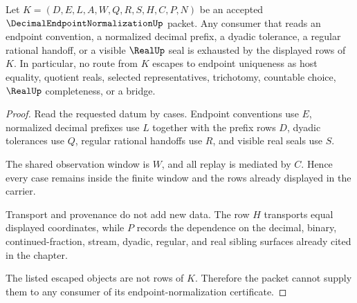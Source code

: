 \begin{theorem}\label{thm:decimal-endpoint-normalization-nonescape}
Let $K=(D,E,L,A,W,Q,R,S,H,C,P,N)$ be an accepted $\DecimalEndpointNormalizationUp$ packet. Any consumer that reads an endpoint convention, a normalized decimal prefix, a dyadic tolerance, a regular rational handoff, or a visible $\RealUp$ seal is exhausted by the displayed rows of $K$. In particular, no route from $K$ escapes to endpoint uniqueness as host equality, quotient reals, selected representatives, trichotomy, countable choice, $\RealUp$ completeness, or a bridge.
\end{theorem}
\begin{proof}
Read the requested datum by cases. Endpoint conventions use $E$, normalized decimal prefixes use $L$ together with the prefix rows $D$, dyadic tolerances use $Q$, regular rational handoffs use $R$, and visible real seals use $S$.

The shared observation window is $W$, and all replay is mediated by $C$. Hence every case remains inside the finite window and the rows already displayed in the carrier.

Transport and provenance do not add new data. The row $H$ transports equal displayed coordinates, while $P$ records the dependence on the decimal, binary, continued-fraction, stream, dyadic, regular, and real sibling surfaces already cited in the chapter.

The listed escaped objects are not rows of $K$. Therefore the packet cannot supply them to any consumer of its endpoint-normalization certificate.
\end{proof}

\begin{closurestatus}{\DecimalEndpointNormalizationUp}
  \theoryclosure{\seedClosure}
  \formalstatus{\unformalizedV}
\end{closurestatus}
